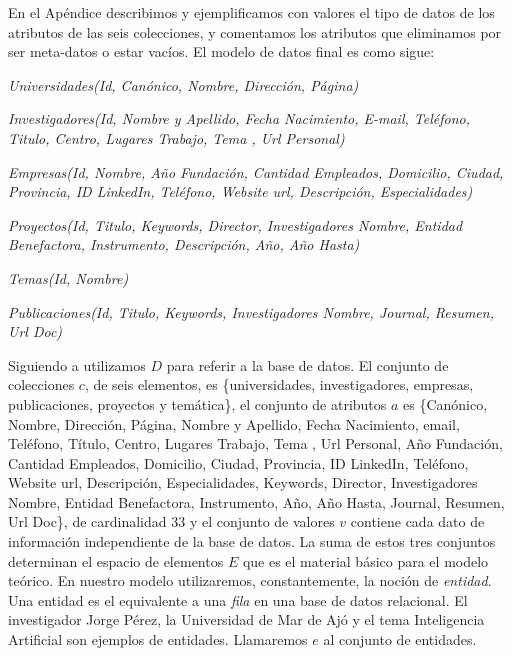 En el Apéndice  describimos y ejemplificamos con valores el tipo de datos de los atributos de las seis colecciones, y comentamos los atributos que eliminamos por ser meta-datos o estar vacíos. El modelo de datos final es como sigue: \newline

\textit{Universidades(Id, Canónico, Nombre, Dirección, Página)} \newline

\textit{Investigadores(Id, Nombre y Apellido, Fecha Nacimiento, E-mail,   Teléfono,   Titulo,  Centro, Lugares Trabajo, Tema ,  Url Personal)} \newline

\textit{Empresas(Id, Nombre, Año Fundación, Cantidad Empleados, Domicilio, Ciudad, Provincia, ID LinkedIn, Teléfono, Website url, Descripción, Especialidades)} \newline

\textit{Proyectos(Id, Titulo, Keywords, Director, Investigadores Nombre, Entidad Benefactora, Instrumento, Descripción, Año, Año Hasta)} \newline

\textit{Temas(Id, Nombre)} \newline

\textit{Publicaciones(Id, Titulo, Keywords, Investigadores Nombre, Journal, Resumen, Url Doc)}


Siguiendo a \cite{QADB1} utilizamos $D$ para referir a la base de datos. El conjunto de colecciones $c$, de seis elementos, es \{universidades, investigadores, empresas, publicaciones, proyectos y temática\}, el conjunto de atributos $a$ es \{Canónico, Nombre, Dirección, Página, Nombre y Apellido, Fecha Nacimiento, email, Teléfono, Título, Centro, Lugares Trabajo, Tema , Url Personal, Año Fundación, Cantidad Empleados, Domicilio, Ciudad, Provincia, ID LinkedIn, Teléfono, Website url, Descripción, Especialidades, Keywords, Director, Investigadores Nombre, Entidad Benefactora, Instrumento, Año, Año Hasta, Journal, Resumen, Url Doc\}, de cardinalidad 33 y el conjunto de valores $v$ contiene cada dato de información independiente de la base de datos. La suma de estos tres conjuntos determinan el espacio de elementos $E$ que es el material básico para el modelo teórico. En nuestro modelo utilizaremos, constantemente, la noción de \textit{entidad}. Una entidad es el equivalente a una \textit{fila} en una base de datos relacional. El investigador Jorge Pérez, la Universidad de Mar de Ajó y el tema Inteligencia Artificial son ejemplos de entidades. Llamaremos $e$ al conjunto de entidades.

